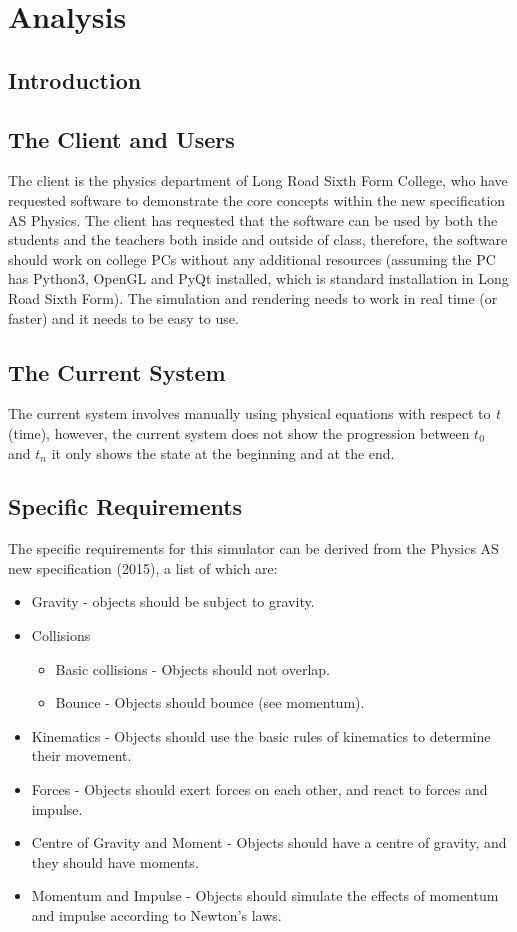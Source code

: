 \chapter{Analysis}

\section{Introduction}

\section{The Client and Users}
The client is the physics department of Long Road Sixth Form College, who have requested software to demonstrate the core concepts within the new specification AS Physics. The client has requested that the software can be used by both the students and the teachers both inside and outside of class, therefore, the software should work on college PCs without any additional resources (assuming the PC has Python3, OpenGL and PyQt installed, which is standard installation in Long Road Sixth Form). The simulation and rendering needs to work in real time (or faster) and it needs to be easy to use.

\section{The Current System}
The current system involves manually using physical equations with respect to \textit{t} (time), however, the current system does not show the progression between $t_0$ and $t_n$ it only shows the state at the beginning and at the end.

\section{Specific Requirements}
The specific requirements for this simulator can be derived from the Physics AS new specification (2015), a list of which are:
\begin{itemize}
	\item Gravity  - objects should be subject to gravity.
	\item Collisions
	\begin{itemize}
		\item Basic collisions - Objects should not overlap.
		\item Bounce - Objects should bounce (see momentum).
	\end{itemize}
	\item Kinematics - Objects should use the basic rules of kinematics to determine their movement.
	\item Forces - Objects should exert forces on each other, and react to forces and impulse.
	\item Centre of Gravity and Moment - Objects should have a centre of gravity, and they should have moments.
	\item Momentum and Impulse - Objects should simulate the effects of momentum and impulse according to Newton's laws.
\end{itemize}

